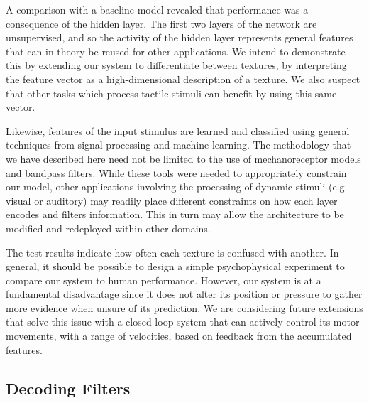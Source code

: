A comparison with a baseline model revealed that performance was a consequence of the hidden layer. The first two layers of the network are unsupervised, and so the activity of the hidden layer represents general features that can in theory be reused for other applications. We intend to demonstrate this by extending our system to differentiate between textures, by interpreting the feature vector as a high-dimensional description of a texture. We also suspect that other tasks which process tactile stimuli  can benefit by using this same vector.

Likewise, features of the input stimulus are learned and classified using general techniques from signal processing and machine learning. The methodology that we have described here need not be limited to the use of mechanoreceptor models and bandpass filters. While these tools were needed to appropriately constrain our model, other applications involving the processing of dynamic stimuli (e.g. visual or auditory) may readily place different constraints on how each layer encodes and filters information. This in turn may allow the architecture to be modified and redeployed within other domains. 

The test results indicate how often each texture is confused with another. 
In general, it should be possible to design a simple psychophysical experiment to compare our system to human performance. However, our system is at a fundamental disadvantage since it does not  alter its position or pressure to gather more evidence when unsure of its prediction. We are considering future extensions that solve this issue with a closed-loop system that can actively control its motor movements, with a range of velocities,  based on feedback from the accumulated features.

\subsection{Decoding Filters}

